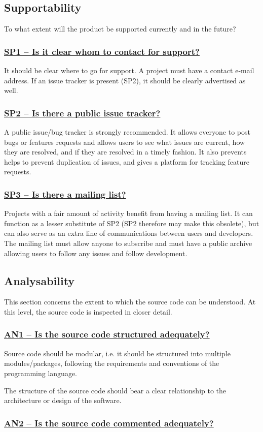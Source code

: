 \documentclass[a4paper,11pt]{article}
\newcommand{\criterion}[1]{\subsubsection*{\underline{#1}}}
\begin{document}
\subsection{Supportability}

To what extent will the product be supported currently and in the future?

\criterion{SP1 -- Is it clear whom to contact for support?}

It should be clear where to go for support. A project must have a contact
e-mail address. If an issue tracker is present (SP2), it should be clearly advertised
as well.

\criterion{SP2 -- Is there a public issue tracker?}

A public issue/bug tracker is strongly recommended. It allows everyone to post
bugs or features requests and allows users to see what issues are current, how
they are resolved, and if they are resolved in a timely fashion. It also
prevents helps to prevent duplication of issues, and gives a platform for
tracking feature requests.

\criterion{SP3 -- Is there a mailing list?}

Projects with a fair amount of activity benefit from having a mailing list. It
can function as a lesser substitute of SP2 (SP2 therefore may make this
obsolete), but can also serve as an extra line of communications between users
and developers. The mailing list must allow anyone to subscribe and must have a
public archive allowing users to follow any issues and follow development.

\subsection{Analysability}

This section concerns the extent to which the source code can be understood. At
this level, the source code is inspected in closer detail.

\criterion{AN1 -- Is the source code structured adequately?}

Source code should be modular, i.e. it should be structured into multiple
modules/packages, following the requirements and conventions of the programming
language. 

The structure of the source code should bear a clear relationship to the
architecture or design of the software.

\criterion{AN2 -- Is the source code commented adequately?}
\end{document}
